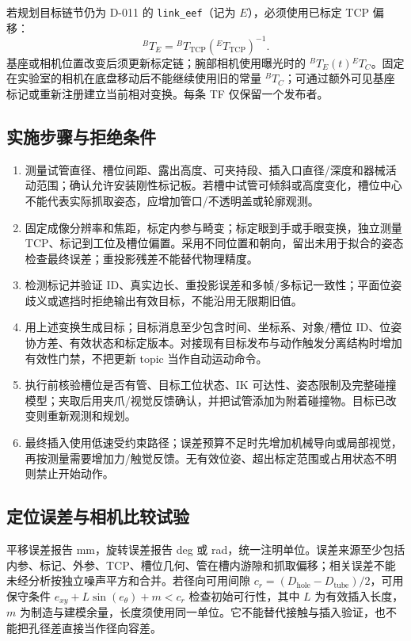 若规划目标链节仍为 D-011 的 \texttt{link\_eef}（记为 $E$），必须使用已标定 TCP 偏移：
\begin{equation}
{}^{B}T_E = {}^{B}T_{\mathrm{TCP}}\left({}^{E}T_{\mathrm{TCP}}\right)^{-1} .
\end{equation}
基座或相机位置改变后须更新标定链；腕部相机使用曝光时的 $ {}^{B}T_E(t){}^{E}T_C$。固定在实验室的相机在底盘移动后不能继续使用旧的常量 $ {}^{B}T_C$；可通过额外可见基座标记或重新注册建立当前相对变换。每条 TF 仅保留一个发布者。

\subsection{实施步骤与拒绝条件}

\begin{enumerate}
  \item 测量试管直径、槽位间距、露出高度、可夹持段、插入口直径/深度和器械活动范围；确认允许安装刚性标记板。若槽中试管可倾斜或高度变化，槽位中心不能代表实际抓取姿态，应增加管口/不透明盖或轮廓观测。
  \item 固定成像分辨率和焦距，标定内参与畸变；标定眼到手或手眼变换，独立测量 TCP、标记到工位及槽位偏置。采用不同位置和朝向，留出未用于拟合的姿态检查最终误差；重投影残差不能替代物理精度。
  \item 检测标记并验证 ID、真实边长、重投影误差和多帧/多标记一致性；平面位姿歧义或遮挡时拒绝输出有效目标，不能沿用无限期旧值。
  \item 用上述变换生成目标；目标消息至少包含时间、坐标系、对象/槽位 ID、位姿协方差、有效状态和标定版本。对接现有目标发布与动作触发分离结构时增加有效性门禁，不把更新 topic 当作自动运动命令。
  \item 执行前核验槽位是否有管、目标工位状态、IK 可达性、姿态限制及完整碰撞模型；夹取后用夹爪/视觉反馈确认，并把试管添加为附着碰撞物。目标已改变则重新观测和规划。
  \item 最终插入使用低速受约束路径；误差预算不足时先增加机械导向或局部视觉，再按测量需要增加力/触觉反馈。无有效位姿、超出标定范围或占用状态不明则禁止开始动作。
\end{enumerate}

\subsection{定位误差与相机比较试验}

平移误差报告 mm，旋转误差报告 deg 或 rad，统一注明单位。误差来源至少包括内参、标记、外参、TCP、槽位几何、管在槽内游隙和抓取偏移；相关误差不能未经分析按独立噪声平方和合并。若径向可用间隙 $c_r=(D_{\mathrm{hole}}-D_{\mathrm{tube}})/2$，可用保守条件 $e_{xy}+L\sin(e_\theta)+m<c_r$ 检查初始可行性，其中 $L$ 为有效插入长度，$m$ 为制造与建模余量，长度须使用同一单位。它不能替代接触与插入验证，也不能把孔径差直接当作径向容差。

